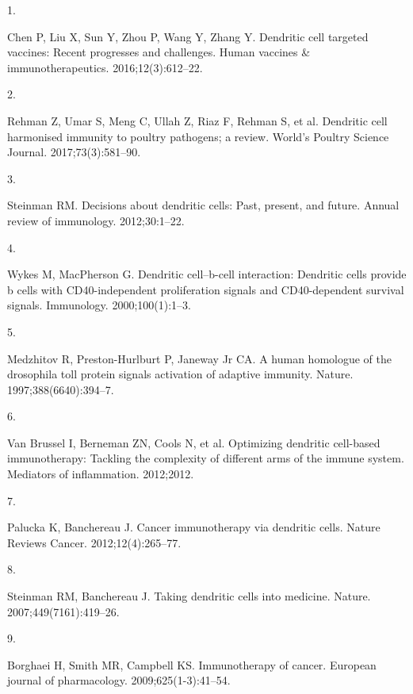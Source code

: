 \documentclass[
]{article}
\newlength{\cslhangindent}
\newlength{\csllabelwidth}
\newenvironment{CSLReferences}[2] %
 {\begin{list}{}{%
  \setlength{\itemindent}{0pt}
  \setlength{\leftmargin}{0pt}
  \setlength{\parsep}{0pt}
  \ifodd #1
   \setlength{\leftmargin}{\cslhangindent}
   \setlength{\itemindent}{-1\cslhangindent}
  \fi
  \setlength{\itemsep}{#2\baselineskip}}}
 {\end{list}}
\newcommand{\CSLLeftMargin}[1]{\parbox[t]{\csllabelwidth}{\strut#1\strut}}
\newcommand{\CSLRightInline}[1]{\parbox[t]{\linewidth - \csllabelwidth}{\strut#1\strut}}
\begin{document}
\label{refs}
\begin{CSLReferences}{0}{1}
\CSLLeftMargin{1. }%
\CSLRightInline{Chen P, Liu X, Sun Y, Zhou P, Wang Y, Zhang Y. Dendritic
cell targeted vaccines: Recent progresses and challenges. Human vaccines
\& immunotherapeutics. 2016;12(3):612--22. }

\CSLLeftMargin{2. }%
\CSLRightInline{Rehman Z, Umar S, Meng C, Ullah Z, Riaz F, Rehman S, et
al. Dendritic cell harmonised immunity to poultry pathogens; a review.
World's Poultry Science Journal. 2017;73(3):581--90. }

\CSLLeftMargin{3. }%
\CSLRightInline{Steinman RM. Decisions about dendritic cells: Past,
present, and future. Annual review of immunology. 2012;30:1--22. }

\CSLLeftMargin{4. }%
\CSLRightInline{Wykes M, MacPherson G. Dendritic cell--b-cell
interaction: Dendritic cells provide b cells with CD40-independent
proliferation signals and CD40-dependent survival signals. Immunology.
2000;100(1):1--3. }

\CSLLeftMargin{5. }%
\CSLRightInline{Medzhitov R, Preston-Hurlburt P, Janeway Jr CA. A human
homologue of the drosophila toll protein signals activation of adaptive
immunity. Nature. 1997;388(6640):394--7. }

\CSLLeftMargin{6. }%
\CSLRightInline{Van Brussel I, Berneman ZN, Cools N, et al. Optimizing
dendritic cell-based immunotherapy: Tackling the complexity of different
arms of the immune system. Mediators of inflammation. 2012;2012. }

\CSLLeftMargin{7. }%
\CSLRightInline{Palucka K, Banchereau J. Cancer immunotherapy via
dendritic cells. Nature Reviews Cancer. 2012;12(4):265--77. }

\CSLLeftMargin{8. }%
\CSLRightInline{Steinman RM, Banchereau J. Taking dendritic cells into
medicine. Nature. 2007;449(7161):419--26. }

\CSLLeftMargin{9. }%
\CSLRightInline{Borghaei H, Smith MR, Campbell KS. Immunotherapy of
cancer. European journal of pharmacology. 2009;625(1-3):41--54. }


\end{CSLReferences}
\end{document}
